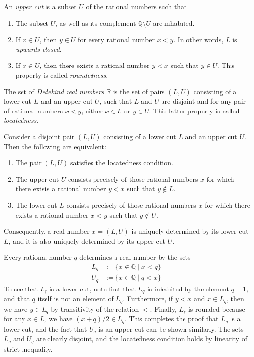 \begin{definition}
  An \emph{upper cut} is a subset $U$ of the rational numbers such that
  \begin{enumerate}
  \item The subset $U$, as well as its complement $\mathbb{Q}\setminus U$ are inhabited.
  \item If $x\in U$, then $y\in U$ for every rational number $x<y$. In other words, $L$ is \emph{upwards closed}.
  \item If $x\in U$, then there exists a rational number $y<x$ such that $y\in U$. This property is called \emph{roundedness}.
  \end{enumerate}
\end{definition}

\begin{definition}
  The set of \emph{Dedekind real numbers} $\mathbb{R}$ is the set of pairs $(L,U)$ consisting of a lower cut $L$ and an upper cut $U$, such that $L$ and $U$ are disjoint and for any pair of rational numbers $x<y$, either $x\in L$ or $y\in U$. This latter property is called \emph{locatedness}.
\end{definition}

\begin{proposition}
  Consider a disjoint pair $(L,U)$ consisting of a lower cut $L$ and an upper cut $U$. Then the following are equivalent:
  \begin{enumerate}
  \item The pair $(L,U)$ satisfies the locatedness condition.
  \item The upper cut $U$ consists precisely of those rational numbers $x$ for which there exists a rational number $y<x$ such that $y\notin L$.
  \item The lower cut $L$ consists precisely of those rational numbers $x$ for which there exists a rational number $x<y$ such that $y\notin U$.
  \end{enumerate}
  Consequently, a real number $x=(L,U)$ is uniquely determined by its lower cut $L$, and it is also uniquely determined by its upper cut $U$.
\end{proposition}

Every rational number $q$ determines a real number by the sets
\begin{align*}
  L_q & := \{x\in\mathbb{Q}\mid x<q\} \\
  U_q & := \{x\in\mathbb{Q}\mid q<x\}.
\end{align*}
To see that $L_q$ is a lower cut, note first that $L_q$ is inhabited by the element $q-1$, and that $q$ itself is not an element of $L_q$. Furthermore, if $y<x$ and $x\in L_q$, then we have $y\in L_q$ by transitivity of the relation $<$. Finally, $L_q$ is rounded because for any $x\in L_q$ we have $(x+q)/2\in L_q$. This completes the proof that $L_q$ is a lower cut, and the fact that $U_q$ is an upper cut can be shown similarly. The sets $L_q$ and $U_q$ are clearly disjoint, and the locatedness condition holds by linearity of strict inequality.


